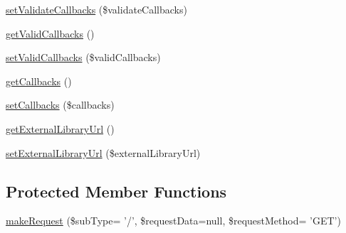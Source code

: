\begin{DoxyCompactItemize}
\hyperlink{classCPSApiComponent_a0df91a7a97e85d6a7aa0635de857073d}{setValidateCallbacks} (\$validateCallbacks)
\item 
\hyperlink{classCPSApiComponent_a0ae83f73b03acd21c05befda99b42584}{getValidCallbacks} ()
\item 
\hyperlink{classCPSApiComponent_aa7cb5b977317a087abe048bc7e1883ec}{setValidCallbacks} (\$validCallbacks)
\item 
\hyperlink{classCPSApiComponent_a96c408925a2b86cb73902a2424cd8d78}{getCallbacks} ()
\item 
\hyperlink{classCPSApiComponent_ac401d5471b684c82e84b269542c0f041}{setCallbacks} (\$callbacks)
\item 
\hyperlink{classCPSApiComponent_a008c92d7af501bf1640a88fbc4f4d68e}{getExternalLibraryUrl} ()
\item 
\hyperlink{classCPSApiComponent_a4151f1feb361515462dd299733372171}{setExternalLibraryUrl} (\$externalLibraryUrl)
\end{DoxyCompactItemize}
\subsection*{Protected Member Functions}
\begin{DoxyCompactItemize}
\item 
\hyperlink{classCPSApiComponent_a6abe5f209ab716aa691b752e6530bd7c}{makeRequest} (\$subType= '/', \$requestData=null, \$requestMethod= 'GET')
\end{DoxyCompactItemize}
